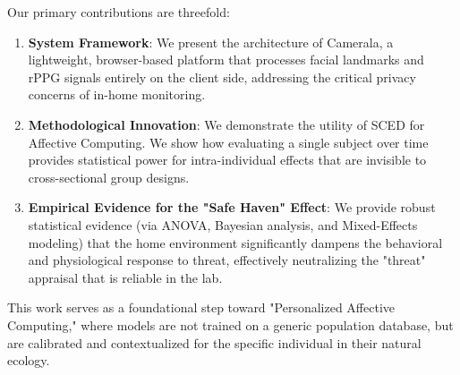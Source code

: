Our primary contributions are threefold:
\begin{enumerate}
    \item \textbf{System Framework}: We present the architecture of Camerala, a lightweight, browser-based platform that processes facial landmarks and rPPG signals entirely on the client side, addressing the critical privacy concerns of in-home monitoring.
    \item \textbf{Methodological Innovation}: We demonstrate the utility of SCED for Affective Computing. We show how evaluating a single subject over time provides statistical power for intra-individual effects that are invisible to cross-sectional group designs.
    \item \textbf{Empirical Evidence for the "Safe Haven" Effect}: We provide robust statistical evidence (via ANOVA, Bayesian analysis, and Mixed-Effects modeling) that the home environment significantly dampens the behavioral and physiological response to threat, effectively neutralizing the "threat" appraisal that is reliable in the lab.
\end{enumerate}

This work serves as a foundational step toward "Personalized Affective Computing," where models are not trained on a generic population database, but are calibrated and contextualized for the specific individual in their natural ecology.
